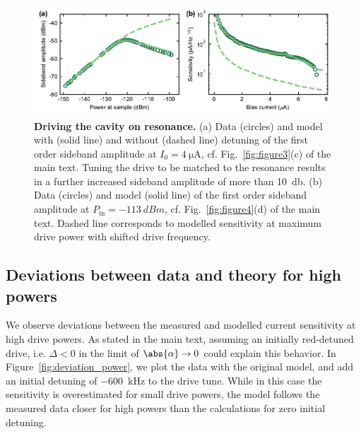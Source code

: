 \begin{figure}
	\centering
	\includegraphics[width=\linewidth]{chapter-currentdetection/figures/SM_Duffing_on_resonance}
	\caption{
		\textbf{Driving the cavity on resonance.}
		(a) Data (circles) and model with (solid line) and without (dashed line) detuning of the first order sideband amplitude at $I_0=\SI{4}{\micro\ampere}$, cf. Fig.~\ref{fig:figure3}(c) of the main text.
		Tuning the drive to be matched to the resonance results in a further increased sideband amplitude of more than \SI{10}{\decibel}.
		(b) Data (circles) and model (solid line) of the first order sideband amplitude at $P_\text{in}=\SI{-113}{dBm}$, cf. Fig.~\ref{fig:figure4}(d) of the main text.
		Dashed line corresponds to modelled sensitivity at maximum drive power with shifted drive frequency.
	}
	\label{fig:Duffing-on-res}
\end{figure}



\subsection{Deviations between data and theory for high powers}\label{sec:deviation_power}

We observe deviations between the measured and modelled current sensitivity at high drive powers.
% 
As stated in the main text, assuming an initially red-detuned drive, i.e. $\Delta<0$ in the limit of $\abs{\alpha}\rightarrow 0$ could explain this behavior.
% 
In Figure~\ref{fig:deviation_power}, we plot the data with the original model, and add an initial detuning of \SI{-600}{\kilo\hertz} to the drive tune.
% 
While in this case the sensitivity is overestimated for small drive powers, the model follows the measured data closer for high powers than the calculations for zero initial detuning.

